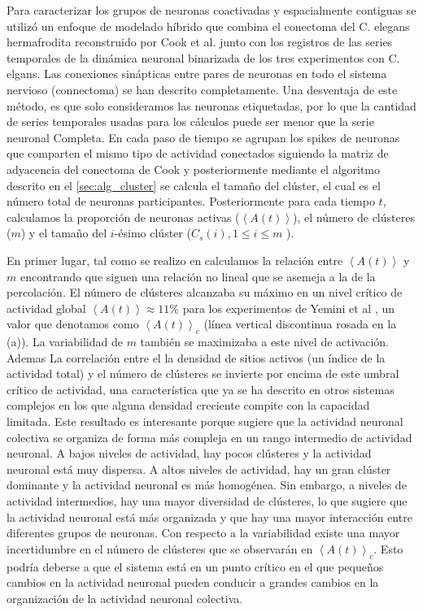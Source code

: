 Para caracterizar los grupos de neuronas coactivadas y espacialmente contiguas se utilizó  un enfoque de modelado híbrido que combina el conectoma del C. elegans hermafrodita reconstruido por Cook et al.  \cite{cook_whole-animal_2019}  junto con   los registros   de  las  series temporales de la dinámica neuronal binarizada  de los tres experimentos   con C. elgans. Las conexiones sinápticas entre pares de neuronas en todo el sistema nervioso (connectoma) se han descrito completamente.  Una desventaja de este método, es que  solo consideramos las neuronas etiquetadas, por lo que la cantidad de series temporales usadas para los cálculos puede ser menor que la serie neuronal Completa.  En cada paso de tiempo  se agrupan los spikes de neuronas  que comparten el mismo tipo de actividad conectados siguiendo la matriz de adyacencia del conectoma de Cook y posteriormente mediante el algoritmo descrito en el \cref{sec:alg_cluster} se calcula el tamaño del clúster, el cual  es el número total de neuronas participantes.  Posteriormente para cada tiempo $t$, calculamos la proporción de neuronas activas ($\left\langle A(t) \right\rangle$), el número de clústeres ($m$) y el tamaño del $i$-ésimo clúster ($C_s(i), 1 \leq i \leq m$ ).  



En primer lugar, tal como se realizo en  \cite{ponce-alvarez_whole-brain_2018,tagliazucchi_criticality_2012} calculamos la relación entre $\left\langle A(t) \right\rangle$ y $m$ encontrando  que  siguen una relación no lineal que se asemeja a la de la percolación.  El número de clústeres alcanzaba su máximo en un nivel crítico de actividad global  $ \left\langle A(t) \right\rangle \approx 11\%$ para los experimentos de Yemini et al \cite{yemini_neuropal_2021},  un valor que denotamos como $\left\langle A(t) \right\rangle_c$ (línea  vertical discontinua rosada en la  (a)). La variabilidad de $m$ también se maximizaba a este nivel de activación.  Ademas La correlación entre el la densidad  de sitios activos (un índice de la actividad total) y el número de clústeres se invierte por encima de este umbral crítico de actividad, una característica que ya se ha descrito en otros sistemas complejos en los que alguna densidad creciente compite con la capacidad limitada. Este resultado es interesante porque sugiere que la actividad neuronal colectiva se organiza de forma más compleja en un rango intermedio de actividad neuronal. A bajos niveles de actividad, hay pocos clústeres y la actividad neuronal está muy dispersa. A altos niveles de actividad, hay un gran clúster dominante y la actividad neuronal es más homogénea. Sin embargo, a niveles de actividad intermedios, hay una mayor diversidad de clústeres, lo que sugiere que la actividad neuronal está más organizada y que hay una mayor interacción entre diferentes grupos de neuronas. Con respecto a la variabilidad existe una mayor incertidumbre en el número de clústeres que se observarán en $\left\langle A(t) \right\rangle_c$. Esto podría deberse a que el sistema está en un punto crítico en el que pequeños cambios en la actividad neuronal pueden conducir a grandes cambios en la organización de la actividad neuronal colectiva.

